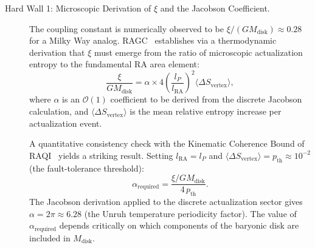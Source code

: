 \documentclass[11pt,a4paper]{article}
\theoremstyle{plain}
\theoremstyle{definition}
\theoremstyle{remark}
\begin{document}
\begin{description}
  \item[Hard Wall 1: Microscopic Derivation of $\xi$ and the Jacobson Coefficient.]
  The coupling constant is numerically observed to be
  $\xi/(G M_{\mathrm{disk}}) \approx 0.28$ for a Milky Way analog.
  RAGC~\citep{Sandeman2026b} establishes via a thermodynamic derivation that
  $\xi$ must emerge from the ratio of microscopic actualization entropy to the
  fundamental RA area element:
  \begin{equation}
    \frac{\xi}{G M_{\mathrm{disk}}}
      = \alpha \times 4\!\left(\frac{l_P}{l_{\mathrm{RA}}}\right)^{\!2}
        \langle\Delta S_{\mathrm{vertex}}\rangle,
    \label{eq:xi_consistency}
  \end{equation}
  where $\alpha$ is an $\mathcal{O}(1)$ coefficient to be derived from the
  discrete Jacobson calculation, and $\langle\Delta S_{\mathrm{vertex}}\rangle$
  is the mean relative entropy increase per actualization event.

  A quantitative consistency check with the Kinematic Coherence Bound of
  RAQI~\citep{Sandeman2026d} yields a striking result. Setting
  $l_{\mathrm{RA}} = l_P$ and $\langle\Delta S_{\mathrm{vertex}}\rangle
  = p_{\mathrm{th}} \approx 10^{-2}$ (the fault-tolerance threshold):
  \begin{equation}
    \alpha_{\mathrm{required}} = \frac{\xi/GM_{\mathrm{disk}}}{4\,p_{\mathrm{th}}}.
    \label{eq:alpha_required}
  \end{equation}
  The Jacobson derivation applied to the discrete actualization sector gives
  $\alpha = 2\pi \approx 6.28$ (the Unruh temperature periodicity factor).
  The value of $\alpha_{\mathrm{required}}$ depends critically on which
  components of the baryonic disk are included in $M_{\mathrm{disk}}$.


\end{description}
\end{document}
